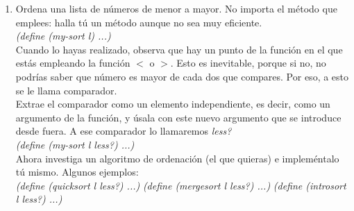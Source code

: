 \documentclass[11pt]{article}
\begin{document}
\begin{enumerate}
  \item Ordena una lista de números de menor a mayor. No importa el método que emplees: halla tú un método aunque no sea muy eficiente.
    \\[3mm]
    \textit{(define (my-sort l) ...)}
    \\[3mm]
    Cuando lo hayas realizado, observa que hay un punto de la función en el que estás empleando la función $<$ o $>$. Esto es inevitable, porque si no, no podrías saber que número es mayor de cada dos que compares. Por eso, a esto se le llama comparador.
    \\[3mm]
    Extrae el comparador como un elemento independiente, es decir, como un argumento de la función, y úsala con este nuevo argumento que se introduce desde fuera. A ese comparador lo llamaremos \textit{less?}
    \\[3mm]
    \textit{(define (my-sort l less?) ...)}
    \\[3mm]
    Ahora investiga un algoritmo de ordenación (el que quieras) e impleméntalo tú mismo. Algunos ejemplos:
    \\[3mm]
    \textit{(define (quicksort l less?) ...)}
    \newline \textit{(define (mergesort l less?) ...)}
    \newline \textit{(define (introsort l less?) ...)}

\end{enumerate}
\end{document}
